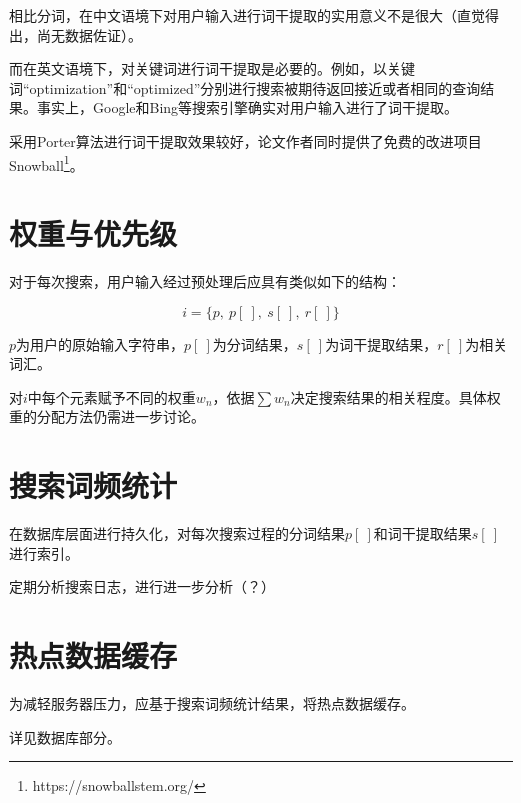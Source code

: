 \documentclass[UTF8]{ctexrep}
\begin{document}
相比分词，在中文语境下对用户输入进行词干提取的实用意义不是很大（直觉得出，尚无数据佐证）。

而在英文语境下，对关键词进行词干提取是必要的。例如，以关键词“optimization”和“optimized”分别进行搜索被期待返回接近或者相同的查询结果。事实上，Google和Bing等搜索引擎确实对用户输入进行了词干提取。

采用Porter算法\cite{porter2006algorithm}进行词干提取效果较好，论文作者同时提供了免费的改进项目Snowball\footnote{https://snowballstem.org/}。

\section{权重与优先级}

对于每次搜索，用户输入经过预处理后应具有类似如下的结构：

$$i=\{p,\ p[\ ],\ s[\ ],\ r[\ ]\}$$

$p$为用户的原始输入字符串，$p[\ ]$为分词结果，$s[\ ]$为词干提取结果，$r[\ ]$为相关词汇。

对$i$中每个元素赋予不同的权重$w_n$，依据$\sum{w_n}$决定搜索结果的相关程度。具体权重的分配方法仍需进一步讨论。

\section{搜索词频统计}

在数据库层面进行持久化，对每次搜索过程的分词结果$p[\ ]$和词干提取结果$s[\ ]$进行索引。

定期分析搜索日志，进行进一步分析（？）

\section{热点数据缓存}

为减轻服务器压力，应基于搜索词频统计结果，将热点数据缓存。

详见数据库部分。




\end{document}
